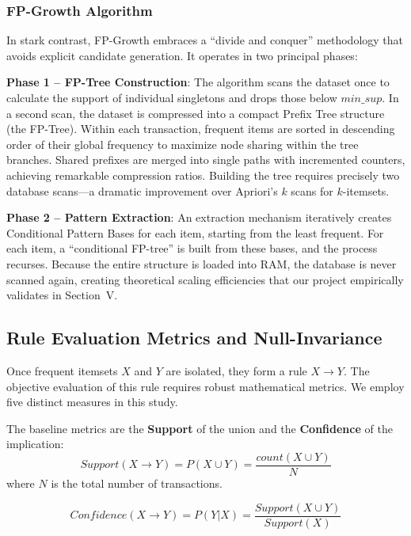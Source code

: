 \documentclass[conference]{IEEEtran}
\begin{document}
\subsubsection{FP-Growth Algorithm}
In stark contrast, FP-Growth embraces a ``divide and conquer'' methodology that avoids explicit candidate generation. It operates in two principal phases:

\textbf{Phase 1 -- FP-Tree Construction}: The algorithm scans the dataset once to calculate the support of individual singletons and drops those below $min\_sup$. In a second scan, the dataset is compressed into a compact Prefix Tree structure (the FP-Tree). Within each transaction, frequent items are sorted in descending order of their global frequency to maximize node sharing within the tree branches. Shared prefixes are merged into single paths with incremented counters, achieving remarkable compression ratios. Building the tree requires precisely two database scans---a dramatic improvement over Apriori's $k$ scans for $k$-itemsets.

\textbf{Phase 2 -- Pattern Extraction}: An extraction mechanism iteratively creates Conditional Pattern Bases for each item, starting from the least frequent. For each item, a ``conditional FP-tree'' is built from these bases, and the process recurses. Because the entire structure is loaded into RAM, the database is never scanned again, creating theoretical scaling efficiencies that our project empirically validates in Section~V.

\subsection{Rule Evaluation Metrics and Null-Invariance}
Once frequent itemsets $X$ and $Y$ are isolated, they form a rule $X \rightarrow Y$. The objective evaluation of this rule requires robust mathematical metrics. We employ five distinct measures in this study.

The baseline metrics are the \textbf{Support} of the union and the \textbf{Confidence} of the implication:
\begin{equation}
Support(X \rightarrow Y) = P(X \cup Y) = \frac{count(X \cup Y)}{N}
\end{equation}
where $N$ is the total number of transactions.

\begin{equation}
Confidence(X \rightarrow Y) = P(Y | X) = \frac{Support(X \cup Y)}{Support(X)}
\end{equation}
\end{document}
